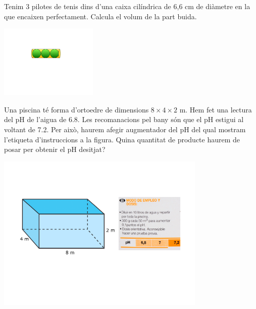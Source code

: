 \begin{mylist}
	
	
\exer[2] Tenim 3 pilotes de tenis dins d'una caixa cilíndrica de 6,6 cm de diàmetre en la que encaixen perfectament. Calcula el volum de la part buida.
\begin{center}
	\includegraphics[width=0.35\textwidth]{img-12/tennis}
\end{center}	

\exer[2] Una piscina té forma d'ortoedre de dimensions $8\times 4 \times 2 $ m. Hem fet una lectura del pH de l'aigua de 6.8. Les recomanacions pel bany són que el pH estigui al voltant de 7.2. Per això, haurem afegir augmentador del pH del qual mostram l'etiqueta d'instruccions a la figura. Quina quantitat de producte haurem de posar per obtenir el pH desitjat?   
\begin{center}
	\includegraphics[width=0.75\textwidth]{img-12/phmas}
\end{center}	


 \end{mylist}

	
 
	